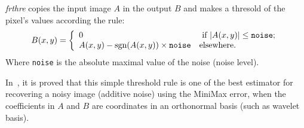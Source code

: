 {\em frthre} copies the input image $A$ in the output $B$ and makes a thresold 
of the pixel's values according the rule:
\[
B(x,y) = \left\{
\begin{array}{ll}
 0 & \mbox{ if } |A(x,y)| \leq \mbox{\tt noise}; \\
 A(x,y) - \mbox{sgn}(A(x,y)) \times \mbox{\tt noise} & \mbox{elsewhere.} 
\end{array}
\right.
\]
Where \verb+noise+ is the absolute maximal value of the noise (noise level).

In~\cite{donoho.johnstone:ideal}, it is proved that this simple threshold rule is one 
of the best estimator for recovering a noisy image (additive noise) using the MiniMax 
error, when the coefficients in $A$ and $B$ are coordinates in an orthonormal basis
(such as wavelet basis).

